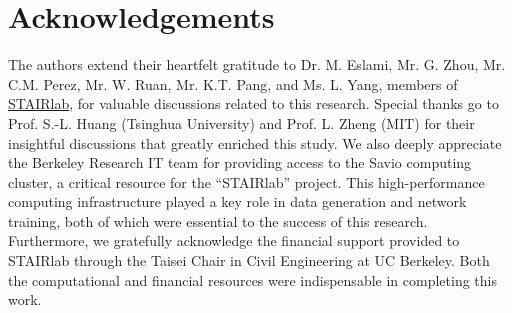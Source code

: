 \section*{Acknowledgements}

The authors extend their heartfelt gratitude to Dr. M. Eslami, Mr. G. Zhou, Mr. C.M. Perez, Mr. W. Ruan, Mr. K.T. Pang, and Ms. L. Yang, members of \href{https://stairlab.berkeley.edu/}{STAIRlab}, for valuable discussions related to this research. Special thanks go to Prof. S.-L. Huang (Tsinghua University) and Prof. L. Zheng (MIT) for their insightful discussions that greatly enriched this study. We also deeply appreciate the Berkeley Research IT team for providing access to the Savio computing cluster, a critical resource for the ``STAIRlab'' project. This  high-performance computing infrastructure played a key role in data generation and network training, both of which were essential to the success of this research. Furthermore, we gratefully acknowledge the financial support provided to STAIRlab through the Taisei Chair in Civil Engineering at UC Berkeley. Both the computational and financial resources were indispensable in completing this work. 